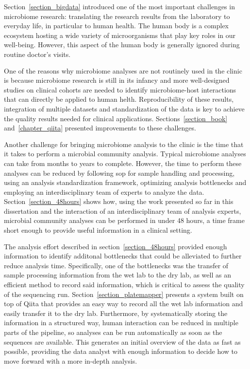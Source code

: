 \documentclass[12pt,chapterheads]{ucsd}
\begin{document}
Section~\ref{section_bigdata} introduced one of the most important challenges in
microbiome research: translating the research results from the laboratory to
everyday life, in particular to human health. The human body is a complex ecosystem
hosting a wide variety of microorganisms that play key roles in our well-being.
However, this aspect of the human body is generally ignored during routine
doctor's visits.

One of the reasons why microbiome analyses are not routinely used in the clinic
is because microbiome research is still in its infancy and more well-designed
studies on clinical cohorts are needed to identify microbiome-host interactions
that can directly be applied to human helth. Reproducibility of these results,
integration of multiple datasets and standardization of the data is key to achieve
the quality results needed for clinical applications. Sections~\ref{section_book}
and~\ref{chapter_qiita} presented improvements to these challenges.

Another challenge for bringing microbiome analysis to the clinic is the time that
it takes to perform a microbial community analysis. Typical microbiome
analyses can take from months to years to complete. However, the time to
perform these analyses can be reduced by following \gls{sop} for sample handling
and processing, using an analysis standardization framework, optimizing analysis
bottlenecks and employing an interdisciplinary team of experts to analyze the data.
Section~\ref{section_48hours} shows how, using the work presented so far in this
dissertation and the interaction of an interdisciplinary team of analysis experts,
microbial community analyses can be performed in under 48 hours, a time frame short
enough to provide useful information in a clinical setting.

The analysis effort described in section~\ref{section_48hours} provided enough
information to identify additonal bottlenecks that could be alleviated to further
reduce analysis time. Specifically, one of the bottlenecks was the transfer of sample
processing information from the wet lab to the dry lab, as well as an efficient
method to record said information, which is critical to assess the quality of the sequencing run.
Section~\ref{section_platemapper} presents a system built on top of Qiita that
provides an easy way to record all the wet lab information and easily transfer
it to the dry lab. Furthermore, by systematically storing the information in a
structured way, human interaction can be reduced in multiple parts of the pipeline,
so analyses can be run automatically as soon as the sequences are available.
This generates an initial overview of the data as fast as possible, providing
the data analyst with enough information to decide how to move forward with a
more in-depth analysis.
\end{document}
